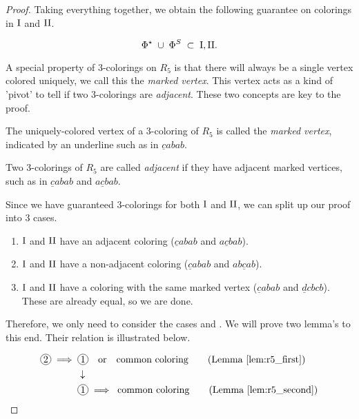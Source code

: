\begin{proof}
Taking everything together, we obtain the following guarantee on colorings in $\text{I}$ and $\text{II}$.

\begin{equation}
    \Phi^\star\; \cup \;\Phi^S \;\subset\; \text{I}, \text{II}.
\end{equation}

A special property of 3-colorings on $R_5$ is that there will always be a single vertex colored uniquely, we call this the \textit{marked vertex}. This vertex acts as a kind of 'pivot' to tell if two 3-colorings are \textit{adjacent}. These two concepts are key to the proof.

\begin{definition}
    The uniquely-colored vertex of a 3-coloring of $R_5$ is called the \emph{marked vertex}, indicated by an underline such as in $\underline{c}abab$.
\end{definition}

\begin{definition}
    Two 3-colorings of $R_5$ are called \emph{adjacent} if they have adjacent marked vertices, such as in $\underline{c}abab$ and $a\underline{c}bab$.
\end{definition}

Since we have guaranteed 3-colorings for both $\text{I}$ and $\text{II}$, we can split up our proof into 3 cases.

\begin{enumerate}
    \item $\text{I}$ and $\text{II}$ have an adjacent coloring ($\underline{c}abab$ and $a\underline{c}bab$).
    \item $\text{I}$ and $\text{II}$ have a non-adjacent coloring ($\underline{c}abab$ and $ab\underline{c}ab$).
    \item $\text{I}$ and $\text{II}$ have a coloring with the same marked vertex ($\underline{c}abab$ and $\underline{d}cbcb$). These are already equal, so we are done.
\end{enumerate}

Therefore, we only need to consider the cases  and . We will prove two lemma's to this end. Their relation is illustrated below.

\begin{equation*}
    \begin{aligned}
    \circled{2} \implies\; &\circled{1}\quad \text{or} \quad \text{common coloring} \quad\quad \text{(Lemma \ref{lem:r5_first})} \\
    &\downarrow \\
    &\circled{1} \implies\;\text{common coloring}\quad\quad \text{(Lemma \ref{lem:r5_second})}
    \end{aligned}
\end{equation*}


\end{proof}
